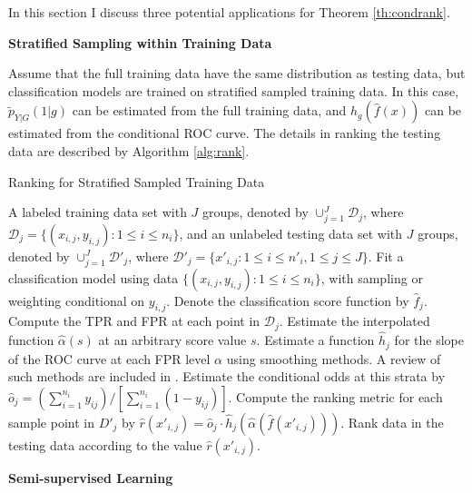 \documentclass{article} %
\begin{document}
In this section I discuss three potential applications for Theorem \ref{th:condrank}.

\textbf{Stratified Sampling within Training Data}

Assume that the full training data have the same distribution as testing data, but classification models are trained on stratified sampled training data. In this case, $\tilde p_{Y|G}(1|g)$ can be estimated from the full training data, and $h_g(\hat f(x))$ can be estimated from the conditional ROC curve. The details in ranking the testing data are described by Algorithm \ref{alg:rank}.

\begin{algorithm}
\caption{Ranking for Stratified Sampled Training Data}
\label{alg:rank}
\begin{algorithmic}[1]
\REQUIRE A labeled training data set with $J$ groups, denoted by $\cup_{j=1}^J \mathcal D_j$, where $\mathcal D_j=\{(x_{i,j},y_{i,j}):1\leq i\leq n_i\}$, and an unlabeled testing data set with $J$ groups, denoted by $\cup_{j=1}^J \mathcal D'_j$, where $\mathcal D'_j=\{x'_{i,j}: 1\leq i\leq n'_i,1\leq j\leq J\}$.
\STATE Fit a classification model using data $\{(x_{i,j},y_{i,j}):1\leq i\leq n_i\}$, with sampling or weighting conditional on $y_{i,j}$. Denote the classification score function by $\hat f_j$.
\STATE Compute the TPR and FPR at each point in $\mathcal D_j$. Estimate the interpolated function $\hat \alpha(s)$ at an arbitrary score value $s$.
\STATE Estimate a function $\hat h_j$ for the slope of the ROC curve at each FPR level $\alpha$ using smoothing methods. A review of such methods are included in \cite{gonccalves2014roc}.
\STATE Estimate the conditional odds at this strata by $\hat o_j=(\sum_{i=1}^{n_i}y_{ij})/[\sum_{i=1}^{n_i}(1-y_{ij})]$.
\STATE Compute the ranking metric for each sample point in $D'_j$ by $\hat r(x'_{i,j})=\hat o_j\cdot \hat h_j(\hat\alpha(\hat f(x'_{i,j})))$.
\ENDFOR
\STATE Rank data in the testing data according to the value $\hat r(x'_{i,j})$.
\end{algorithmic}
\end{algorithm}

\textbf{Semi-supervised Learning}\label{sec:semi}
\end{document}
